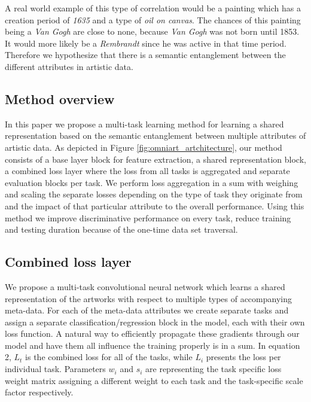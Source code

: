 \documentclass[sigconf]{acmart}
\begin{document}
A real world example of this type of correlation would be a painting which has a creation period of \textit{1635} and a type of \textit{oil on canvas}. The chances of this painting being a \textit{Van Gogh} are close to none, because \textit{Van Gogh} was not born until 1853. It would more likely be a \textit{Rembrandt} since he was active in that time period. Therefore we hypothesize that there is a semantic entanglement between the different attributes in artistic data. 

\subsection{Method overview}

In this paper we propose a multi-task learning method for learning a shared representation based on the semantic entanglement between multiple attributes of artistic data. As depicted in Figure \ref{fig:omniart_artchitecture}, our method consists of a base layer block for feature extraction, a shared representation block, a combined loss layer where the loss from all tasks is aggregated and separate evaluation blocks per task. We perform loss aggregation in a sum with weighing and scaling the separate losses depending on the type of task they originate from and the impact of that particular attribute to the overall performance. 
Using this method we improve discriminative performance on every task, reduce training and testing duration because of the one-time data set traversal.

\subsection{Combined loss layer}

We propose a multi-task convolutional neural network which learns a shared representation of the artworks with respect to multiple types of accompanying meta-data. For each of the meta-data attributes we create separate tasks and assign a separate classification/regression block in the model, each with their own loss function. A natural way to efficiently propagate these gradients through our model and have them all influence the training properly is in a sum. In equation 2,  
\begin{math}
L_{t}
\end{math}
is the combined loss for all of the tasks, while 
\begin{math}
L_{i}
\end{math}
presents the loss per individual task. Parameters 
\begin{math}
w_{i}
\end{math}
and
\begin{math}
s_{i}
\end{math}
are representing the task specific loss weight matrix assigning a different weight to each task and the task-specific scale factor respectively.
\end{document}
